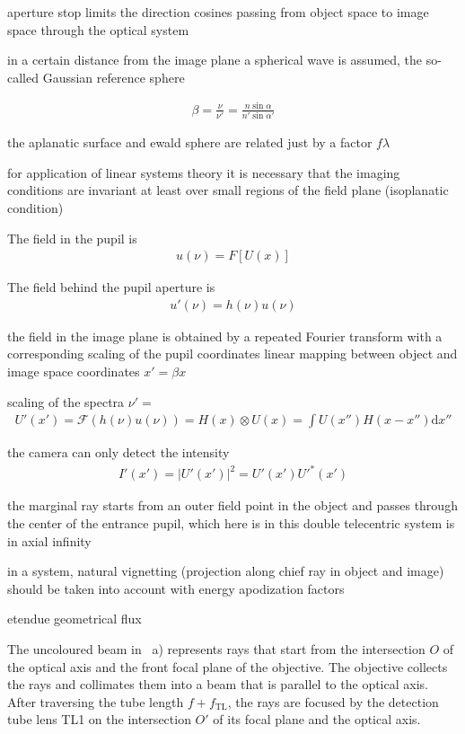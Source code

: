aperture stop limits the direction cosines passing from object space
to image space through the optical system

in a certain distance from the image plane a spherical wave is assumed,
the so-called Gaussian reference sphere


\begin{align}
  \beta = \frac{\nu}{\nu'}=\frac{n\sin\alpha}{n'\sin\alpha'}
\end{align} %

the aplanatic surface and ewald sphere are related just by a factor
$f\lambda$

for application of linear systems theory it is necessary that the
imaging conditions are invariant at least over small regions of the
field plane (isoplanatic condition)

The field in the pupil is
\begin{align}
u(\nu)=F\left[U(x)\right]
\end{align}


The field behind the pupil aperture is
\begin{align}
u'(\nu)=h(\nu) u(\nu)
\end{align}

the field in the image plane is obtained by a repeated Fourier
transform with a corresponding scaling of the pupil coordinates
linear mapping between object and image space coordinates $x'=\beta x$

scaling of the spectra $\nu'=$
\begin{align}
U'(x')=\mathcal{F}(h(\nu) u(\nu)) = H(x) \otimes U(x) = \int U(x'') H(x-x'') \textrm{d}x''
\end{align}

the camera can only detect the intensity
\begin{align}
I'(x')=|U'(x')|^2=U'(x')U'^*(x')
\end{align}

the marginal ray starts from an outer field point in the object and
passes through the center of the entrance pupil, which here is in
this double telecentric system is in axial infinity 

in a system, natural vignetting (projection along chief ray in object
and image) should be taken into account with energy apodization
factors

etendue
geometrical flux



The uncoloured beam in ~a) represents
rays that start from the intersection $O$ of the optical axis and the
front focal plane of the objective. The objective collects the rays
and collimates them into a beam that is parallel to the optical
axis. After traversing the tube length $f+f_\mathrm{TL}$, the rays are
focused by the detection tube lens TL1 on the intersection $O'$ of its
focal plane and the optical axis. 

